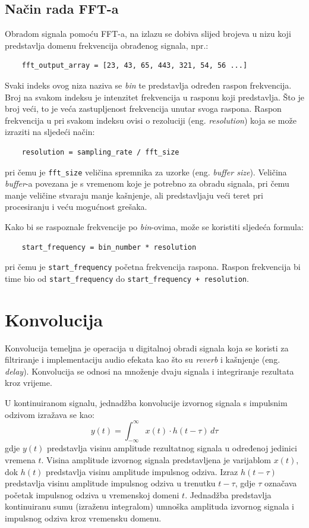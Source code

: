 \documentclass[times, utf8, seminar, numeric]{fer}
\begin{document}
\subsection{Način rada FFT-a}

Obradom signala pomoću FFT-a, na izlazu se dobiva slijed brojeva u nizu koji predstavlja domenu frekvencija obrađenog signala, npr.:
\begin{verbatim}
	fft_output_array = [23, 43, 65, 443, 321, 54, 56 ...]
\end{verbatim}
Svaki indeks ovog niza naziva se \textit{bin} te predstavlja određen raspon frekvencija. Broj na svakom indeksu je intenzitet frekvencija u rasponu koji predstavlja. Što je broj veći, to je veća zastupljenost frekvencija unutar svoga raspona. Raspon frekvencija u pri svakom indeksu ovisi o rezoluciji (eng. \textit{resolution}) koja se može izraziti na sljedeći način:
\begin{verbatim}
	resolution = sampling_rate / fft_size
\end{verbatim}
pri čemu je \verb|fft_size| veličina spremnika za uzorke (eng. \textit{buffer size}).\cite{lourde2009digital} Veličina \textit{buffer}-a povezana je s vremenom koje je potrebno za obradu signala, pri čemu manje veličine stvaraju manje kašnjenje, ali predstavljaju veći teret pri procesiranju i veću mogućnost grešaka.\cite{focusrite_2022}

Kako bi se raspoznale frekvencije po \textit{bin}-ovima, može se koristiti sljedeća formula:
\begin{verbatim}
	start_frequency = bin_number * resolution
\end{verbatim}
pri čemu je \verb|start_frequency| početna frekvencija raspona.\cite{gustine_2021} Raspon frekvencija bi time bio od \verb|start_frequency| do \verb|start_frequency + resolution|.

\section{Konvolucija}

Konvolucija temeljna je operacija u digitalnoj obradi signala koja se koristi za filtriranje i implementaciju audio efekata kao što su \textit{reverb} i kašnjenje (eng. \textit{delay}). Konvolucija se odnosi na množenje dvaju signala i integriranje rezultata kroz vrijeme.\cite{krishna2017digital} 

U kontinuiranom signalu, jednadžba konvolucije izvornog signala s impulsnim odzivom izražava se kao:
\begin{equation*}
	y(t) = \int_{-\infty}^{\infty} x(t) \cdot h(t - \tau) \,d\tau
\end{equation*}
gdje $y(t)$ predstavlja visinu amplitude rezultatnog signala u određenoj jedinici vremena $t$. Visina amplitude izvornog signala predstavljena je varijablom $x(t)$, dok $h(t)$ predstavlja visinu amplitude impulsnog odziva. Izraz $h(t - \tau)$ predstavlja visinu amplitude impulsnog odziva u trenutku $t - \tau$, gdje $\tau$ označava početak impulsnog odziva u vremenskoj domeni $t$. Jednadžba predstavlja kontinuiranu sumu (izraženu integralom) umnoška amplituda izvornog signala i impulsnog odziva kroz vremensku domenu.
\end{document}
